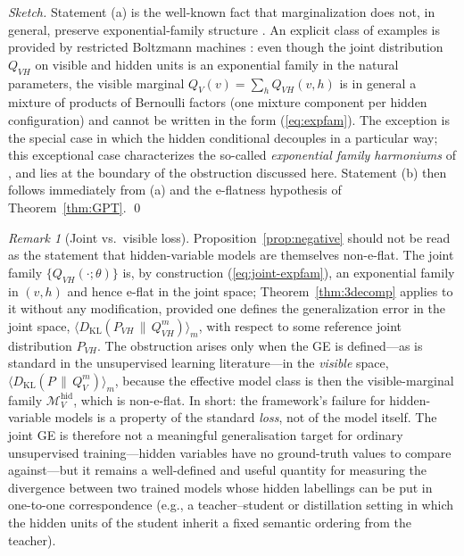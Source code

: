 \documentclass[11pt,a4paper]{article}
\theoremstyle{definition}
\theoremstyle{remark}
\newtheorem*{remark}{Remark}
\newcommand{\KL}{D_{\mathrm{KL}}}
\newcommand{\PV}{P}
\newcommand{\Mfam}{\mathcal{M}}
\begin{document}
\begin{proof}[Sketch]
Statement (a) is the well-known fact that marginalization does not,
in general, preserve exponential-family structure
\cite[\S 8]{Amari2016}. An explicit class of examples is provided
by restricted Boltzmann machines \cite{Smolensky1986,Hinton2002}:
even though the joint distribution $Q_{VH}$ on visible and hidden
units is an exponential family in the natural parameters, the
visible marginal $Q_{V}(v) = \sum_{h} Q_{VH}(v,h)$ is in general a
mixture of products of Bernoulli factors (one mixture component per
hidden configuration) and cannot be written in the form
(\ref{eq:expfam}). The exception is the special case in which the
hidden conditional decouples in a particular way; this exceptional
case characterizes the so-called \emph{exponential family
harmoniums} of \cite{WellingRosenZviHinton2005}, and lies at the
boundary of the obstruction discussed here.
Statement (b) then follows immediately from (a) and the
e-flatness hypothesis of Theorem~\ref{thm:GPT}.
\qed
\end{proof}

\begin{remark}[Joint vs.\ visible loss]
\label{rem:joint-vs-visible}
Proposition~\ref{prop:negative} should not be read as the
statement that hidden-variable models are themselves non-e-flat.
The joint family $\{Q_{VH}(\cdot;\theta)\}$ is, by construction
(\ref{eq:joint-expfam}), an exponential family in $(v, h)$ and
hence e-flat in the joint space; Theorem~\ref{thm:3decomp}
applies to it without any modification, provided one defines the
generalization error in the joint space,
$\langle\KL(P_{VH}\,\|\,Q_{VH}^{m})\rangle_{m}$, with respect
to some reference joint distribution $P_{VH}$. The obstruction
arises only when the GE is defined---as is standard in the
unsupervised learning literature---in the \emph{visible} space,
$\langle\KL(\PV\,\|\,Q_{V}^{m})\rangle_{m}$, because the
effective model class is then the visible-marginal family
$\Mfam_{V}^{\mathrm{hid}}$, which is non-e-flat. In short: the
framework's failure for hidden-variable models is a property of
the standard \emph{loss}, not of the model itself. The joint GE
is therefore not a meaningful generalisation target for
ordinary unsupervised training---hidden variables have no
ground-truth values to compare against---but it remains a
well-defined and useful quantity for measuring the divergence
between two trained models whose hidden labellings can be put
in one-to-one correspondence (e.g., a teacher--student or
distillation setting in which the hidden units of the student
inherit a fixed semantic ordering from the teacher).
\end{remark}
\end{document}
